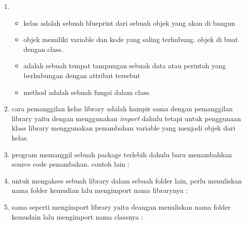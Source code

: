 \documentclass[12pt]{article}
\begin{document}
\begin{enumerate}
		\item 
			\begin{itemize}
				\item kelas adalah sebuah blueprint dari sebuah objek yang akan di bangun
							
				\item objek memiliki variable dan kode yang saling terhubung. objek di buat dengan class.
				
				\item adalah sebuah tempat tampungan sebuah data atau perintah yang berhubungan dengan attribut tersebut
				
				\item method adalah sebuah fungsi dalam class.
				
				
			\end{itemize}			
			
		\item cara pemanggilan kelas library adalah hampir sama dengan pemanggilan library yaitu dengan menggunakan \textit{import} dahulu tetapi untuk penggunaan klass library menggunakan penambahan variable yang menjadi objek dari kelas.
		
		
		\item program memanggil sebuah package terlebih dahulu baru menambahkan source code penambahan. contoh lain :
		
		
		\item untuk mengakses sebuah library dalam sebuah folder lain, perlu menuliskan nama folder kemudian lalu mengimport nama librarynya :
		
		
		\item sama seperti mengimport library yaitu deangan menuliskan nama folder kemudain lalu mengimport nama classnya :
		
		
			
		
	\end{enumerate}
\end{document}
